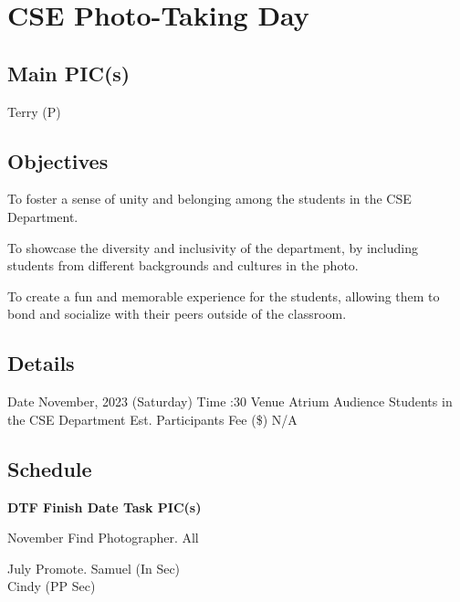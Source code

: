 \section{CSE Photo-Taking Day}

\subsection{Main PIC(s)}
Terry (P)

\subsection{Objectives}
\startitemize
\item To foster a sense of unity and belonging among the students in the CSE Department.
\item To showcase the diversity and inclusivity of the department, by including students from different backgrounds and cultures in the photo.
\item To create a fun and memorable experience for the students, allowing them to bond and socialize with their peers outside of the classroom.
\stopitemize

\subsection{Details}
\starttabulate[|rB|l|]
\NC Date
 November, 2023 (Saturday) \NR
\NC Time
:30 \NR
\NC Venue
\NC Atrium \NR
\NC Audience
\NC Students in the CSE Department \NR
\NC Est. Participants
 \NR
\NC Fee (\$)
\NC N/A \NR
\stoptabulate

\subsection{Schedule}

\setupTABLE[c][1][width=0.75in]
\setupTABLE[c][2][width=1in]
\setupTABLE[c][3][width=3in]
\setupTABLE[c][4][width=1.25in]
\bTABLE
\bTABLEhead

\bTR\bTH    \bf{DTF}
\eTH\bTH    \bf{Finish Date}
\eTH\bTH    \bf{Task}
\eTH\bTH    \bf{PIC(s)}
\eTH\eTR

\eTABLEhead
\bTABLEbody

\bTR{}
\eTD{} November
\eTD\bTD Find Photographer.
\eTD\bTD All
\eTD\eTR

\bTR{}
\eTD{} July
\eTD\bTD Promote.
\eTD\bTD Samuel (In Sec) \\ Cindy (PP Sec)
\eTD\eTR

